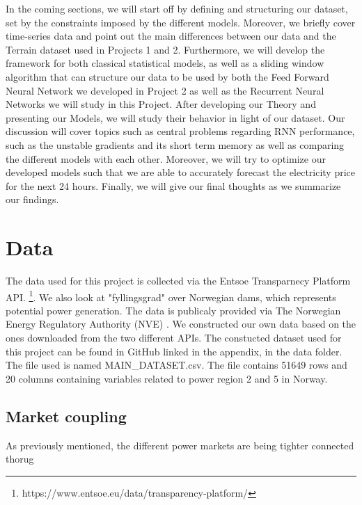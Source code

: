 \documentclass
[twocolumn,
secnumarabic,
nobibnotes,
aps,
prl,
reprint,
groupedaddress,
amsmath,
amssymb,
]{revtex4-2}
\begin{document}
In the coming sections, we will start off by defining and structuring our dataset, set by the constraints imposed by the different models. Moreover, we briefly cover time-series data and point out the main differences between our data and the Terrain dataset used in Projects 1 and 2. Furthermore, we will develop the framework for both classical statistical models, as well as a sliding window algorithm that can structure our data to be used by both the Feed Forward Neural Network we developed in Project 2 as well as the Recurrent Neural Networks we will study in this Project. After developing our Theory and presenting our Models, we will study their behavior in light of our dataset. Our discussion will cover topics such as central problems regarding RNN performance, such as the unstable gradients and its short term memory as well as comparing the different models with each other. Moreover, we will try to optimize our developed models such that we are able to accurately forecast the electricity price for the next 24 hours. Finally, we will give our final thoughts as we summarize our findings.

\section{Data}
The data used for this project is collected via the Entsoe Transparnecy Platform API. \footnote{https://www.entsoe.eu/data/transparency-platform/}. We also look at "fyllingsgrad" over Norwegian dams, which represents potential power generation. The data is publicaly provided via The Norwegian Energy Regulatory Authority (NVE) \cite{noauthor_magasinstatistikk_nodate}. 
We constructed our own data based on the ones downloaded from the two different APIs. The constucted dataset used for this project can be found in GitHub linked in the appendix, in the data folder. The file used is named MAIN\_DATASET.csv. The file contains 51649 rows and 20 columns containing variables related to power region 2 and 5 in Norway.


\subsection{Market coupling}
As previously mentioned, the different power markets are being tighter connected thorug  
\end{document}
